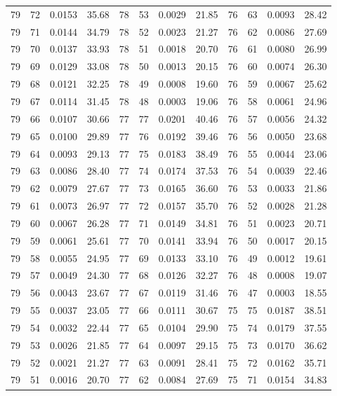\begin{tabular}{llll|llll|llll}
79 & 72 & 0.0153 & 35.68 & 78 & 53 & 0.0029 & 21.85 & 76 & 63 & 0.0093 & 28.42\\
79 & 71 & 0.0144 & 34.79 & 78 & 52 & 0.0023 & 21.27 & 76 & 62 & 0.0086 & 27.69\\
79 & 70 & 0.0137 & 33.93 & 78 & 51 & 0.0018 & 20.70 & 76 & 61 & 0.0080 & 26.99\\
79 & 69 & 0.0129 & 33.08 & 78 & 50 & 0.0013 & 20.15 & 76 & 60 & 0.0074 & 26.30\\
79 & 68 & 0.0121 & 32.25 & 78 & 49 & 0.0008 & 19.60 & 76 & 59 & 0.0067 & 25.62\\
79 & 67 & 0.0114 & 31.45 & 78 & 48 & 0.0003 & 19.06 & 76 & 58 & 0.0061 & 24.96\\
79 & 66 & 0.0107 & 30.66 & 77 & 77 & 0.0201 & 40.46 & 76 & 57 & 0.0056 & 24.32\\
79 & 65 & 0.0100 & 29.89 & 77 & 76 & 0.0192 & 39.46 & 76 & 56 & 0.0050 & 23.68\\
79 & 64 & 0.0093 & 29.13 & 77 & 75 & 0.0183 & 38.49 & 76 & 55 & 0.0044 & 23.06\\
79 & 63 & 0.0086 & 28.40 & 77 & 74 & 0.0174 & 37.53 & 76 & 54 & 0.0039 & 22.46\\
79 & 62 & 0.0079 & 27.67 & 77 & 73 & 0.0165 & 36.60 & 76 & 53 & 0.0033 & 21.86\\
79 & 61 & 0.0073 & 26.97 & 77 & 72 & 0.0157 & 35.70 & 76 & 52 & 0.0028 & 21.28\\
79 & 60 & 0.0067 & 26.28 & 77 & 71 & 0.0149 & 34.81 & 76 & 51 & 0.0023 & 20.71\\
79 & 59 & 0.0061 & 25.61 & 77 & 70 & 0.0141 & 33.94 & 76 & 50 & 0.0017 & 20.15\\
79 & 58 & 0.0055 & 24.95 & 77 & 69 & 0.0133 & 33.10 & 76 & 49 & 0.0012 & 19.61\\
79 & 57 & 0.0049 & 24.30 & 77 & 68 & 0.0126 & 32.27 & 76 & 48 & 0.0008 & 19.07\\
79 & 56 & 0.0043 & 23.67 & 77 & 67 & 0.0119 & 31.46 & 76 & 47 & 0.0003 & 18.55\\
79 & 55 & 0.0037 & 23.05 & 77 & 66 & 0.0111 & 30.67 & 75 & 75 & 0.0187 & 38.51\\
79 & 54 & 0.0032 & 22.44 & 77 & 65 & 0.0104 & 29.90 & 75 & 74 & 0.0179 & 37.55\\
79 & 53 & 0.0026 & 21.85 & 77 & 64 & 0.0097 & 29.15 & 75 & 73 & 0.0170 & 36.62\\
79 & 52 & 0.0021 & 21.27 & 77 & 63 & 0.0091 & 28.41 & 75 & 72 & 0.0162 & 35.71\\
79 & 51 & 0.0016 & 20.70 & 77 & 62 & 0.0084 & 27.69 & 75 & 71 & 0.0154 & 34.83\\

\end{tabular}
